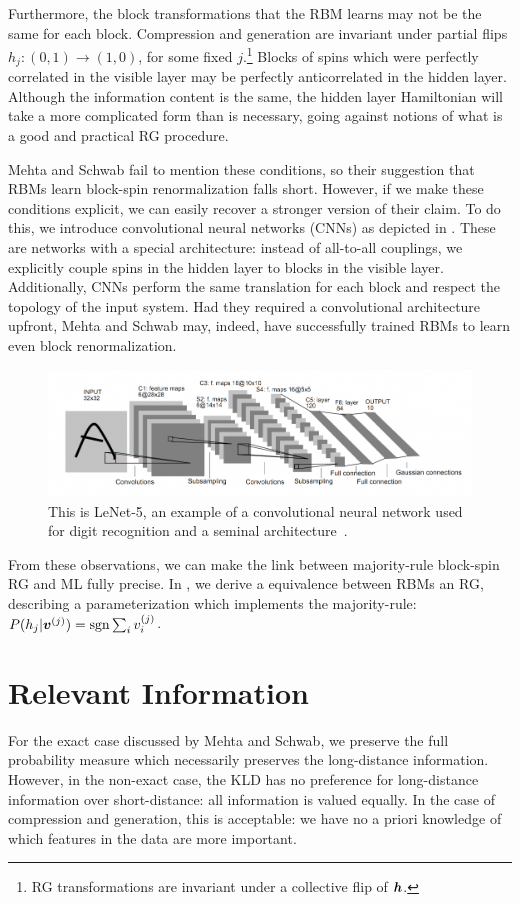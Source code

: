 Furthermore, the block transformations that the RBM learns may not be
the same for each block. Compression and generation are invariant
under partial flips $h_j:(0,1)\rightarrow(1,0)$, for some fixed
$j$.\footnote{RG transformations are invariant under a collective flip
  of $\boldsymbol{h}$.} Blocks of spins which were perfectly correlated in the
visible layer may be perfectly anticorrelated in the hidden
layer. Although the information content is the same, the hidden layer
Hamiltonian will take a more complicated form than is necessary, going
against notions of what is a good and practical RG procedure.

Mehta and Schwab fail to mention these conditions, so their suggestion
that RBMs learn block-spin renormalization falls short. However, if we
make these conditions explicit, we can easily recover a stronger
version of their claim. To do this, we introduce convolutional neural
networks (CNNs) as depicted in . These are networks with
a special architecture: instead of all-to-all couplings, we explicitly
couple spins in the hidden layer to blocks in the visible
layer. Additionally, CNNs perform the same translation for each block
and respect the topology of the input system. Had they required a
convolutional architecture upfront, Mehta and Schwab may, indeed, have
successfully trained RBMs to learn even block renormalization.


\begin{figure}[]
  \centering \includegraphics[width=\textwidth]{figures/cnn.png}
  \caption{This is LeNet-5, an example of a convolutional neural
    network used for digit recognition and a seminal
    architecture~\cite{lecun}.\label{fig:cnn} }
\end{figure}

From these observations, we can make the link between majority-rule
block-spin RG and ML fully precise.  In , we
derive a equivalence between RBMs an RG, describing a parameterization
which implements the majority-rule:
$P(h_j|\boldsymbol{v}^{(j)})=\operatorname{sgn} \sum_i v_i^{(j)}$.

\section{Relevant Information}
For the exact case discussed by Mehta and Schwab, we preserve the full
probability measure which necessarily preserves the long-distance
information. However, in the non-exact case, the KLD has no preference
for long-distance information over short-distance: all information is
valued equally. In the case of compression and generation, this is
acceptable: we have no a priori knowledge of which features in the
data are more important.

